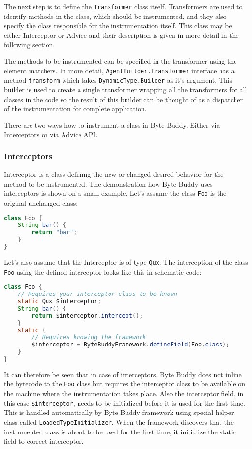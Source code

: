 The next step is to define the \texttt{Transformer} class itself. Transformers are used to identify methods in the class, which should be instrumented, and they also specify the class responsible for the instrumentation itself. This class may be either Interceptor or Advice and their description is given in more detail in the following section. 

The methods to be instrumented can be specified in the transformer using the element matchers. In more detail, \texttt{AgentBuilder.Transformer} interface has a method \texttt{transform} which takes \texttt{DynamicType.Builder} as it's argument. This builder is used to create a single transformer wrapping all the transformers for all classes in the code so the result of this builder can be thought of as a dispatcher of the instrumentation for complete application.

There are two ways how to instrument a class in Byte Buddy. Either via Interceptors or via Advice API.
\subsubsection{Interceptors}
Interceptor is a class defining the new or changed desired behavior for the method to be instrumented.  The demonstration how Byte Buddy uses interceptors is shown on a small example. Let's assume the class \texttt{Foo} is the original unchanged class:
\begin{lstlisting}[language=Java]
class Foo {
	String bar() {
		return "bar"; 
	}
}
\end{lstlisting}
	
Let's also assume that the Interceptor is of type \texttt{Qux}. The interception of the class \texttt{Foo} using the defined interceptor looks like this in schematic code:

\begin{lstlisting}[language=Java]
class Foo {
	// Requires your interceptor class to be known
	static Qux $interceptor;
	String bar() {
		return $interceptor.intercept(); 
	}
	static {
		// Requires knowing the framework
		$interceptor = ByteBuddyFramework.defineField(Foo.class);
	}
}
\end{lstlisting}
		
It can therefore be seen that in case of interceptors, Byte Buddy does not inline the bytecode to the \texttt{Foo} class but requires the interceptor class to be available on the machine where the instrumentation takes place. Also the interceptor field, in this case \texttt{\$interceptor}, needs to be initialized before it is used for the first time. This is handled automatically by Byte Buddy framework using special helper class called \texttt{LoadedTypeInitializer}. When the framework discovers that the instrumented class is about to be used for the first time, it initialize the static field to correct interceptor.

